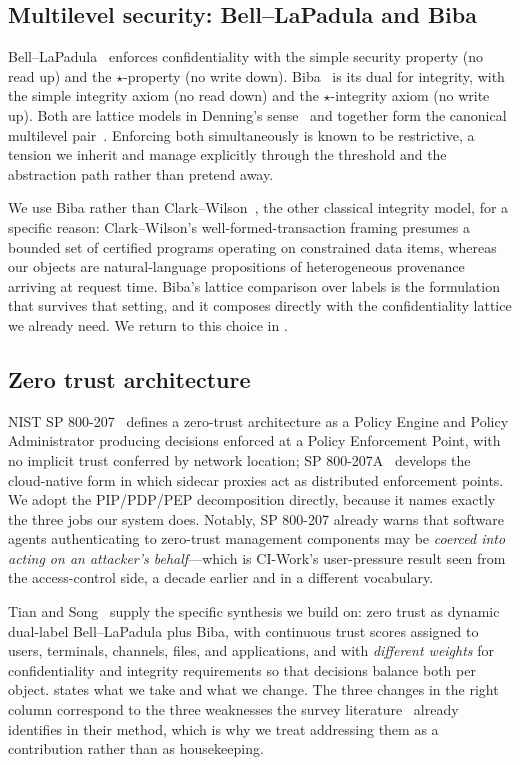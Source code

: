 \subsection{Multilevel security: Bell--LaPadula and Biba}

Bell--LaPadula~\cite{belllapadula1976} enforces confidentiality with the
simple security property (no read up) and the $\star$-property (no write
down). Biba~\cite{biba1977} is its dual for integrity, with the simple
integrity axiom (no read down) and the $\star$-integrity axiom (no write up).
Both are lattice models in Denning's sense~\cite{denning1976} and together form
the canonical multilevel pair~\cite{nistir7316}. Enforcing both simultaneously
is known to be restrictive, a tension we inherit and manage explicitly through
the threshold and the abstraction path rather than pretend away.

We use Biba rather than Clark--Wilson~\cite{clarkwilson1987}, the other
classical integrity model, for a specific reason: Clark--Wilson's
well-formed-transaction framing presumes a bounded set of certified programs
operating on constrained data items, whereas our objects are natural-language
propositions of heterogeneous provenance arriving at request time. Biba's
lattice comparison over labels is the formulation that survives that setting,
and it composes directly with the confidentiality lattice we already need. We
return to this choice in .

\subsection{Zero trust architecture}

NIST SP 800-207~\cite{nist800207} defines a zero-trust architecture as a Policy
Engine and Policy Administrator producing decisions enforced at a Policy
Enforcement Point, with no implicit trust conferred by network location;
SP 800-207A~\cite{nist800207a} develops the cloud-native form in which sidecar
proxies act as distributed enforcement points. We adopt the PIP/PDP/PEP
decomposition directly, because it names exactly the three jobs our system
does. Notably, SP 800-207 already warns that software agents authenticating to
zero-trust management components may be \emph{coerced into acting on an
attacker's behalf}---which is CI-Work's user-pressure result seen from the
access-control side, a decade earlier and in a different vocabulary.

Tian and Song~\cite{tiansong2021} supply the specific synthesis we build on:
zero trust as dynamic dual-label Bell--LaPadula plus Biba, with continuous
trust scores assigned to users, terminals, channels, files, and applications,
and with \emph{different weights} for confidentiality and integrity
requirements so that decisions balance both per object. 
states what we take and what we change. The three changes in the right column
correspond to the three weaknesses the survey
literature~\cite{he2022zerotrust,sultana2024zerotrust} already identifies in
their method, which is why we treat addressing them as a contribution rather
than as housekeeping.

